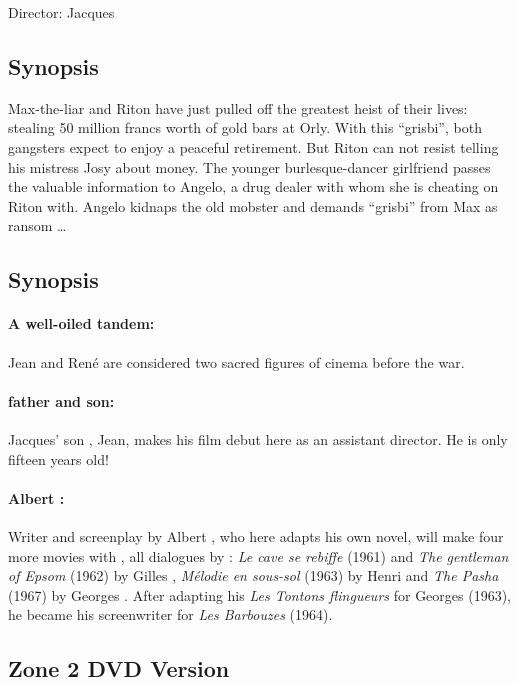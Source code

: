 Director: Jacques 

\subsection*{Synopsis}

Max-the-liar and Riton have just pulled off the greatest heist of their lives: stealing 50 million francs worth of gold bars at Orly. With this ``grisbi'', both gangsters expect to enjoy a peaceful retirement. But Riton can not resist telling his mistress Josy about money. The younger burlesque-dancer girlfriend passes the valuable information to Angelo, a drug dealer with whom she is cheating on Riton with. Angelo kidnaps the old mobster and demands ``grisbi'' from Max as ransom \dots{}

\subsection*{Synopsis} 

\paragraph{A well-oiled tandem:} Jean  and René  are considered two sacred figures of cinema before the war.
\paragraph{ father and son:} Jacques' son , Jean, makes his film debut here as an assistant director. He is only fifteen years old!
\paragraph{Albert :} Writer and screenplay by Albert , who here adapts  his own novel, will make four more movies with , all dialogues by : \emph{Le cave se rebiffe} (1961) and \emph{The gentleman of Epsom} (1962) by Gilles , \emph{Mélodie en sous-sol} (1963) by Henri  and \emph{The Pasha} (1967) by Georges . After adapting his \emph{Les Tontons flingueurs} for Georges  (1963), he became his screenwriter for \emph{Les Barbouzes} (1964).

\subsection*{Zone 2 DVD Version}

